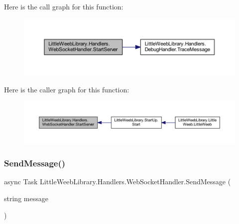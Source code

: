 Here is the call graph for this function\+:\nopagebreak
\begin{figure}[H]
\begin{center}
\leavevmode
\includegraphics[width=350pt]{class_little_weeb_library_1_1_handlers_1_1_web_socket_handler_a23d4ffbabdb67c97ea843d4e7dc5cbdd_cgraph}
\end{center}
\end{figure}
Here is the caller graph for this function\+:\nopagebreak
\begin{figure}[H]
\begin{center}
\leavevmode
\includegraphics[width=350pt]{class_little_weeb_library_1_1_handlers_1_1_web_socket_handler_a23d4ffbabdb67c97ea843d4e7dc5cbdd_icgraph}
\end{center}
\end{figure}
\mbox{\label{class_little_weeb_library_1_1_handlers_1_1_web_socket_handler_a1de289d54d665a32c93478c68d3e6ad0}} 
\subsubsection{\texorpdfstring{Send\+Message()}{SendMessage()}}
{\footnotesize\ttfamily async Task Little\+Weeb\+Library.\+Handlers.\+Web\+Socket\+Handler.\+Send\+Message (\begin{DoxyParamCaption}\item[{string}]{message }\end{DoxyParamCaption})}



